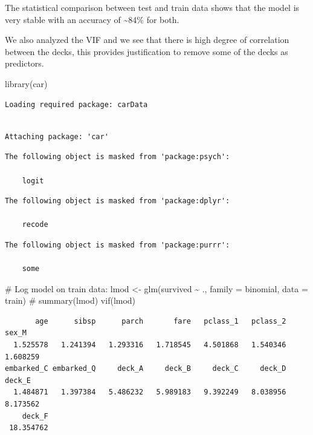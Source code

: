 \documentclass[
  letterpaper,
  DIV=11,
  numbers=noendperiod]{scrartcl}
\newenvironment{Shaded}{\begin{snugshade}}{\end{snugshade}}
\newcommand{\AttributeTok}[1]{\textcolor[rgb]{0.40,0.45,0.13}{#1}}
\newcommand{\CommentTok}[1]{\textcolor[rgb]{0.37,0.37,0.37}{#1}}
\newcommand{\FunctionTok}[1]{\textcolor[rgb]{0.28,0.35,0.67}{#1}}
\newcommand{\NormalTok}[1]{\textcolor[rgb]{0.00,0.23,0.31}{#1}}
\newcommand{\OtherTok}[1]{\textcolor[rgb]{0.00,0.23,0.31}{#1}}
\newcommand{\SpecialCharTok}[1]{\textcolor[rgb]{0.37,0.37,0.37}{#1}}
\begin{document}
The statistical comparison between test and train data shows that the
model is very stable with an accuracy of \textasciitilde84\% for both.

We also analyzed the VIF and we see that there is high degree of
correlation between the decks, this provides justification to remove
some of the decks as predictors.

\begin{Shaded}
\begin{Highlighting}[]
\FunctionTok{library}\NormalTok{(car)}
\end{Highlighting}
\end{Shaded}

\begin{verbatim}
Loading required package: carData
\end{verbatim}

\begin{verbatim}

Attaching package: 'car'
\end{verbatim}

\begin{verbatim}
The following object is masked from 'package:psych':

    logit
\end{verbatim}

\begin{verbatim}
The following object is masked from 'package:dplyr':

    recode
\end{verbatim}

\begin{verbatim}
The following object is masked from 'package:purrr':

    some
\end{verbatim}

\begin{Shaded}
\begin{Highlighting}[]
\CommentTok{\# Log model on train data:}
\NormalTok{lmod }\OtherTok{\textless{}{-}} \FunctionTok{glm}\NormalTok{(survived }\SpecialCharTok{\textasciitilde{}}\NormalTok{ ., }\AttributeTok{family =}\NormalTok{ binomial, }\AttributeTok{data =}\NormalTok{ train)}
\CommentTok{\# summary(lmod)}
\FunctionTok{vif}\NormalTok{(lmod)}
\end{Highlighting}
\end{Shaded}

\begin{verbatim}
       age      sibsp      parch       fare   pclass_1   pclass_2      sex_M 
  1.525578   1.241394   1.293316   1.718545   4.501868   1.540346   1.608259 
embarked_C embarked_Q     deck_A     deck_B     deck_C     deck_D     deck_E 
  1.484871   1.397384   5.486232   5.989183   9.392249   8.038956   8.173562 
    deck_F 
 18.354762 
\end{verbatim}
\end{document}
